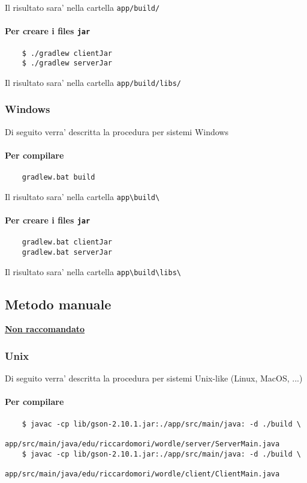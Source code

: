 Il risultato sara' nella cartella \texttt{app/build/}

\paragraph{Per creare i files \texttt{jar}}
\begin{verbatim}
	$ ./gradlew clientJar
	$ ./gradlew serverJar
\end{verbatim}

Il risultato sara' nella cartella \texttt{app/build/libs/}

\medskip
\subsubsection{Windows}
Di seguito verra' descritta la procedura per sistemi Windows

\paragraph{Per compilare}
\begin{verbatim}
	gradlew.bat build
\end{verbatim}

Il risultato sara' nella cartella \texttt{app\textbackslash build\textbackslash}

\paragraph{Per creare i files \texttt{jar}}
\begin{verbatim}
	gradlew.bat clientJar
	gradlew.bat serverJar
\end{verbatim}

Il risultato sara' nella cartella \texttt{app\textbackslash build\textbackslash libs\textbackslash}

\bigskip
\bigskip
\hypertarget{manual}{}
\subsection{Metodo manuale}

\underline{\textbf{Non raccomandato}}

\subsubsection{Unix}
Di seguito verra' descritta la procedura per sistemi Unix-like (Linux, MacOS, ...)

\paragraph{Per compilare}
\begin{verbatim}
	$ javac -cp lib/gson-2.10.1.jar:./app/src/main/java: -d ./build \ 
	    app/src/main/java/edu/riccardomori/wordle/server/ServerMain.java
	$ javac -cp lib/gson-2.10.1.jar:./app/src/main/java: -d ./build \
	    app/src/main/java/edu/riccardomori/wordle/client/ClientMain.java
\end{verbatim}

